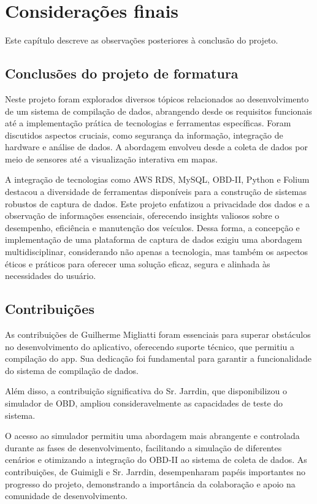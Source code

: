 \chapter{Considerações finais}

Este capítulo descreve as observações posteriores à conclusão do projeto.

\section{Conclusões do projeto de formatura}
Neste projeto foram explorados diversos tópicos relacionados ao desenvolvimento de um sistema de compilação de dados, abrangendo desde os requisitos funcionais até a implementação prática de tecnologias e ferramentas específicas. Foram discutidos aspectos cruciais, como segurança da informação, integração de hardware e análise de dados. A abordagem envolveu desde a coleta de dados por meio de sensores até a visualização interativa em mapas. 

A integração de tecnologias como AWS RDS, MySQL, OBD-II, Python e Folium destacou a diversidade de ferramentas disponíveis para a construção de sistemas robustos de captura de dados. Este projeto enfatizou a privacidade dos dados e a  observação de informações essenciais, oferecendo insights valiosos sobre o desempenho, eficiência e manutenção dos veículos. Dessa forma, a concepção e implementação de uma plataforma de captura de dados exigiu uma abordagem multidisciplinar, considerando não apenas a tecnologia, mas também os aspectos éticos e práticos para oferecer uma solução eficaz, segura e alinhada às necessidades do usuário.

\section{Contribuições}
As contribuições de Guilherme Migliatti foram essenciais para superar obstáculos no desenvolvimento do aplicativo, oferecendo suporte técnico, que permitiu a compilação do app. Sua dedicação foi fundamental para garantir a funcionalidade do sistema de compilação de dados.

Além disso, a contribuição significativa do Sr. Jarrdin, que disponibilizou o simulador de OBD, ampliou consideravelmente as capacidades de teste do sistema. 

O acesso ao simulador permitiu uma abordagem mais abrangente e controlada durante as fases de desenvolvimento, facilitando a simulação de diferentes cenários e otimizando a integração do OBD-II ao sistema de coleta de dados. As contribuições, de Guimigli e Sr. Jarrdin, desempenharam papéis importantes no progresso do projeto, demonstrando a importância da colaboração e apoio na comunidade de desenvolvimento.

